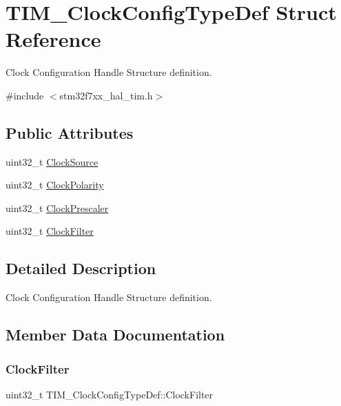 \hypertarget{struct_t_i_m___clock_config_type_def}{}\section{T\+I\+M\+\_\+\+Clock\+Config\+Type\+Def Struct Reference}
\label{struct_t_i_m___clock_config_type_def}


Clock Configuration Handle Structure definition.  




{\ttfamily \#include $<$stm32f7xx\+\_\+hal\+\_\+tim.\+h$>$}

\subsection*{Public Attributes}
\begin{DoxyCompactItemize}
\item 
uint32\+\_\+t \mbox{\hyperlink{struct_t_i_m___clock_config_type_def_a54c329013b5f6f87d1c3d2495fca84d2}{Clock\+Source}}
\item 
uint32\+\_\+t \mbox{\hyperlink{struct_t_i_m___clock_config_type_def_a66453fa8dc8a300267ff5aba08eff5c4}{Clock\+Polarity}}
\item 
uint32\+\_\+t \mbox{\hyperlink{struct_t_i_m___clock_config_type_def_ae4c0cb6f58da0ec7b99f1c6411d2fee1}{Clock\+Prescaler}}
\item 
uint32\+\_\+t \mbox{\hyperlink{struct_t_i_m___clock_config_type_def_adaf66568c766f75c4c661a872ca399e3}{Clock\+Filter}}
\end{DoxyCompactItemize}


\subsection{Detailed Description}
Clock Configuration Handle Structure definition. 

\subsection{Member Data Documentation}
\mbox{\label{struct_t_i_m___clock_config_type_def_adaf66568c766f75c4c661a872ca399e3}} 
\subsubsection{\texorpdfstring{ClockFilter}{ClockFilter}}
{\footnotesize\ttfamily uint32\+\_\+t T\+I\+M\+\_\+\+Clock\+Config\+Type\+Def\+::\+Clock\+Filter}

